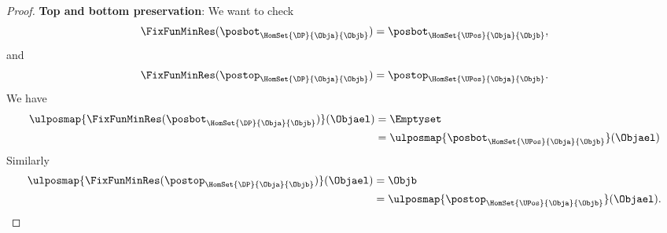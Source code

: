 \begin{proof}
    \textbf{Top and bottom preservation}:
    We want to check
    \begin{equation}
        \FixFunMinRes(\posbot_{\HomSet{\DP}{\Obja}{\Objb}})=\posbot_{\HomSet{\UPos}{\Obja}{\Objb}},
    \end{equation}
    and
    \begin{equation}
        \FixFunMinRes(\postop_{\HomSet{\DP}{\Obja}{\Objb}})=\postop_{\HomSet{\UPos}{\Obja}{\Objb}}.
    \end{equation}
    We have
    \begin{equation}
        \begin{aligned}
            \ulposmap{\FixFunMinRes(\posbot_{\HomSet{\DP}{\Obja}{\Objb}})}(\Objael) & =\Emptyset \\
                                                                                    & =\ulposmap{\posbot_{\HomSet{\UPos}{\Obja}{\Objb}}}(\Objael)
        \end{aligned}
    \end{equation}
    Similarly
    \begin{equation}
        \begin{aligned}
            \ulposmap{\FixFunMinRes(\postop_{\HomSet{\DP}{\Obja}{\Objb}})}(\Objael) & =\Objb \\
                                                                                    & =\ulposmap{\postop_{\HomSet{\UPos}{\Obja}{\Objb}}}(\Objael).
        \end{aligned}
    \end{equation}
\end{proof}


